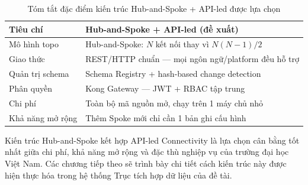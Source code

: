 \begin{table}[H]
\centering
\renewcommand{\arraystretch}{1.4}
\begin{tabularx}{\textwidth}{|l|X|}
\hline
\textbf{Tiêu chí} & \textbf{Hub-and-Spoke + API-led (đề xuất)} \\
\hline
Mô hình topo & Hub-and-Spoke: $N$ kết nối thay vì $N(N-1)/2$ \\
\hline
Giao thức & REST/HTTP chuẩn — mọi ngôn ngữ/platform đều hỗ trợ \\
\hline
Quản trị schema & Schema Registry + hash-based change detection \\
\hline
Phân quyền & Kong Gateway — JWT + RBAC tập trung \\
\hline
Chi phí & Toàn bộ mã nguồn mở, chạy trên 1 máy chủ nhỏ \\
\hline
Khả năng mở rộng & Thêm Spoke mới chỉ cần 1 bản ghi cấu hình \\
\hline
\end{tabularx}
\caption{Tóm tắt đặc điểm kiến trúc Hub-and-Spoke + API-led được lựa chọn}
\label{tab:proposed-architecture}
\end{table}

Kiến trúc Hub-and-Spoke kết hợp API-led Connectivity là lựa chọn cân bằng tốt nhất giữa chi phí, khả năng mở rộng và đặc thù nghiệp vụ của trường đại học Việt Nam. Các chương tiếp theo sẽ trình bày chi tiết cách kiến trúc này được hiện thực hóa trong hệ thống Trục tích hợp dữ liệu của đề tài.
